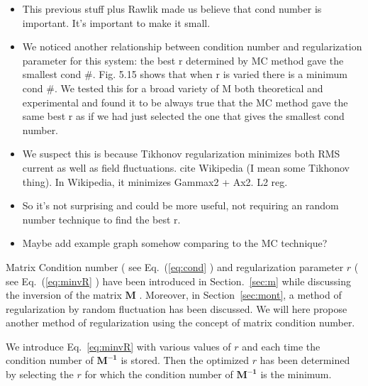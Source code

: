 \begin{itemize}
\item This previous stuff plus Rawlik made us believe that cond number is important.  It's important to make it small.
\item We noticed another relationship between condition number and regularization parameter for this system:  the best r determined by MC method gave the smallest cond \#.  Fig. 5.15 shows that when r is varied there is a minimum cond \#.  We tested this for a broad variety of M both theoretical and experimental and found it to be always true that the MC method gave the same best r as if we had just selected the one that gives the smallest cond number.
\item We suspect this is because Tikhonov regularization minimizes both RMS current as well as field fluctuations.  cite Wikipedia (I mean some Tikhonov thing).  In Wikipedia, it minimizes Gammax2 + Ax2.  L2 reg.
\item So it's not surprising and could be more useful, not requiring an random number technique to find the best r.
\item Maybe add example graph somehow comparing to the MC technique?
\end{itemize}


Matrix Condition number ( see Eq.~(\ref{eq:cond} ) and regularization parameter $r$ ( see Eq.~(\ref{eq:minvR} ) have been introduced in Section.~\ref{sec:m} while discussing the inversion of the matrix $\bm{M}$ . Moreover, in Section~\ref{sec:mont}, a method of regularization by random fluctuation has been discussed. We will here propose another method of regularization using the concept of matrix condition number.
 
 
We introduce Eq.~\ref{eq:minvR} with various values of $r$ and each time the condition number of $\bm{M^{-1}}$ is stored. Then the optimized $r$  has been determined by selecting the $r$ for which the condition number of $\bm{M^{-1}}$ is the minimum.
 

